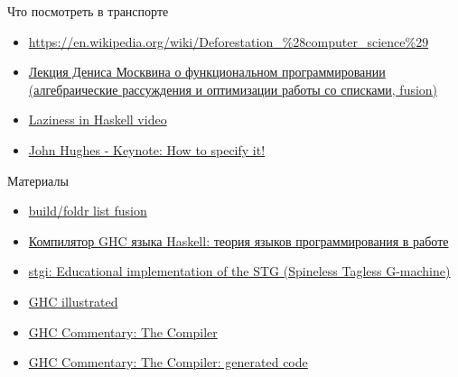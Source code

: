
    \begin{frame}{Что посмотреть в транспорте}
        \begin{itemize}
            \item {\color{blue}\url{https://en.wikipedia.org/wiki/Deforestation\_\%28computer\_science\%29}}
            \item \href{https://youtu.be/d3lYx13kdWU?si=ctrQy6pm_44aOgmR}{\color{blue} Лекция Дениса Москвина о функциональном программировании (алгебраические рассуждения и оптимизации работы со списками, fusion)}
            \item \href{https://www.youtube.com/watch?v=fSqE-HSh_NU&list=PLyzwHTVJlRc8620PjqbM0x435-6-Gi1Gu}{\color{blue}Laziness in Haskell video}
            \item \href{https://youtu.be/G0NUOst-53U?si=vdcKVUi9vSPBY0Jz}{\color{blue}John Hughes - Keynote: How to specify it!}
        \end{itemize}
    \end{frame}

    \begin{frame}{Материалы}
        \begin{itemize}
            \item \href{https://wiki.haskell.org/GHC\_optimisations\#Fusion}{\color{blue} build/foldr list fusion}
            \item \href{https://www.lektorium.tv/node/32421}{\color{blue} Компилятор GHC языка Haskell: теория языков программирования в работе}
            \item \href{https://hackage.haskell.org/package/stgi}{\color{blue} stgi: Educational implementation of the STG (Spineless Tagless G-machine)}
            \item \href{https://takenobu-hs.github.io/downloads/haskell_ghc_illustrated.pdf}{\color{blue} GHC illustrated}
            \item \href{https://gitlab.haskell.org/ghc/ghc/-/wikis/commentary/compiler/}{\color{blue} GHC Commentary: The Compiler}
            \item \href{https://gitlab.haskell.org/ghc/ghc/-/wikis/commentary/compiler/generated-code}{\color{blue} GHC Commentary: The Compiler: generated code}
        \end{itemize}
    \end{frame}



